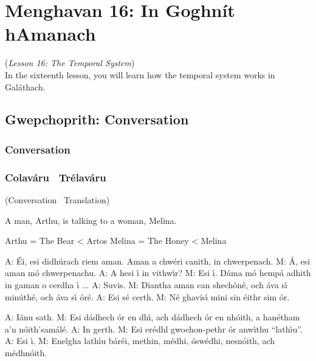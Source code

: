 \section{Menghavan 16: In Goghn\'{i}t hAmanach}
(\textit{Lesson 16: The Temporal System})\\

In the sixteenth lesson, you will learn how the temporal system works in Gal\'{a}thach.

\subsection{Gwepchoprith: Conversation}
\subsubsection{Conversation}


\subsubsection{Colav\'{a}ru \textendash\ Tr\'{e}lav\'{a}ru}
(Conversation \textendash\ Translation)

A man, Arthu, is talking to a woman, Melina.

Arthu = The Bear < Artos
Melina = The Honey < Melina

A: \'{E}i, esi didh\'{u}rach riem aman. Aman a chw\'{e}ri canith, in chwerpenach.
M: \'{A}, esi aman m\'{o} chwerpenachu. 
A: A hesi \'{\i} in vithw\'{\i}r?
M: Esi \'{\i}. D\'{a}ma m\'{o} hemp\'{a} adhith in gaman o cerdha \'{\i} ...
A: Suvis.
M: Diantha aman can shech\'{o}n\'{e}, och \'{a}va s\'{\i} min\'{u}th\'{e}, och \'{a}va s\'{\i} \'{o}r\'{e}.
A: Esi s\'{e} certh.
M: N\'{e} ghavis\'{\i} mini sin \'{e}ithr sim \'{o}r.

A: I\'{a}nu sath.
M: Esi d\'{a}dhech \'{o}r en dh\'{\i}, ach d\'{a}dhech \'{o}r en nh\'{o}ith, a han\'{e}tham a’n n\'{o}ith’sam\'{a}l\'{e}.
A: In gerth.
M: Esi er\'{e}dhl gwochon-pethr \'{o}r anw\'{\i}thu “lath\'{\i}u”.
A: Esi \'{\i}.
M: Enelgha lath\'{\i}u b\'{a}r\'{e}i, methin, m\'{e}dhi, \'{o}sw\'{e}dhi, nesn\'{o}ith, ach m\'{e}dhn\'{o}ith.

